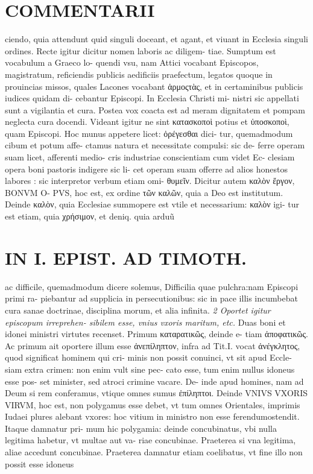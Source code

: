 \documentclass{article}
\begin{document}
\begin{pages}
\section*{COMMENTARII }
\marginpar{[ p.62 ]}\pstart ciendo, quia attendunt quid singuli doceant, et agant, et viuant in Ecclesia singuli ordines. Recte igitur dicitur nomen laboris ac diligem- tiae. Sumptum est vocabulum a Graeco lo- quendi vsu, nam Attici vocabant Episcopos, magistratum, reficiendis publicis aedificiis praefectum, legatos quoque in prouincias missos, quales Lacones vocabant ἁρμοςτὰς, et in certaminibus publicis iudices quidam di- cebantur Episcopi. In Ecclesia Christi mi- nistri sic appellati sunt a vigilantia et cura. Postea vox coacta est ad meram dignitatem et pompam neglecta cura docendi. Videant igitur ne sint κατασκοποὶ potius et ὑποσκοποὶ, quam Episcopi.  \pend\pstart Hoc munus appetere licet: ὀρέγεσθαι dici- tur, quemadmodum cibum et potum affe- ctamus natura et necessitate compulsi: sic de- ferre operam suam licet, afferenti medio- cris industriae conscientiam cum videt Ec- clesiam opera boni pastoris indigere sic li- cet operam suam offerre ad alios honestos labores : sic interpretor verbum etiam omi- θυμεῖν.  \pend\pstart Dicitur autem καλὸν ἔργον, BONVM O- PVS, hoc est, ex ordine τῶν καλῶν, quia a Deo est institutum. Deinde καλὸν, quia Ecclesiae summopere est vtile et necessarium: καλὸν igi- tur est etiam, quia χρήσιμον, et deniq. quia arduũ  \pend
\section*{IN I. EPIST. AD TIMOTH. }
\marginpar{[ p.63 ]}\pstart ac difficile, quemadmodum dicere solemus, Difficilia quae pulchra:nam Episcopi primi ra- piebantur ad supplicia in persecutionibus: sic in pace illis incumbebat cura sanae doctrinae, disciplina morum, et alia infinita.  \pend
\textit{2 Oportet igitur episcopum irreprehen- sibilem esse, vnius vxoris maritum, etc. }\pstart Duas boni et idonei ministri virtutes recenset. Primum καταρατικῶς, deinde e- tiam ἀποφατικῶς. Ac primum ait oportere illum esse ἀνεπίληπτον, infra ad Tit.I. vocat ἀνέγκλητος, quod significat hominem qui cri- minis non possit conuinci, vt sit apud Eccle- siam extra crimen: non enim vult sine pec- cato esse, tum enim nullus idoneus esse pos- set minister, sed atroci crimine vacare. De- inde apud homines, nam ad Deum si rem conferamus, vtique omnes sumus ἐπίληπτοι. Deinde VNIVS VXORIS VIRVM, hoc est, non polygamus esse debet, vt tum omnes Orientales, imprimis Iudaei plures alebant vxores: hoc vitium in ministro non esse ferendumostendit. Itaque damnatur pri- mum hic polygamia: deinde concubinatus, vbi nulla legitima habetur, vt multae aut va- riae concubinae. Praeterea si vna legitima, aliae accedunt concubinae. Praeterea damnatur etiam coelibatus, vt fine illo non possit esse idoneus  \pend

\end{pages}
\end{document}
